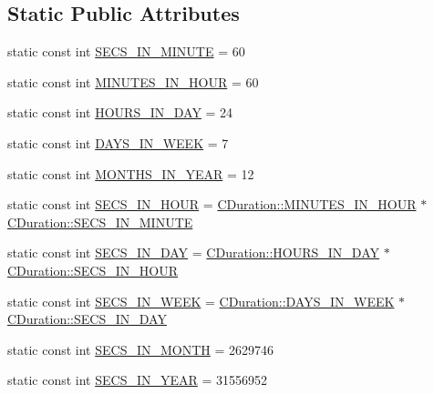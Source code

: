 \subsection*{Static Public Attributes}
\begin{DoxyCompactItemize}
\item 
static const int \mbox{\hyperlink{class_c_duration_add8e91add3f049bee7409b5a3eca2c4c}{S\+E\+C\+S\+\_\+\+I\+N\+\_\+\+M\+I\+N\+U\+TE}} = 60
\item 
static const int \mbox{\hyperlink{class_c_duration_a97547b80518b4782cdc7ae2be794c14d}{M\+I\+N\+U\+T\+E\+S\+\_\+\+I\+N\+\_\+\+H\+O\+UR}} = 60
\item 
static const int \mbox{\hyperlink{class_c_duration_a1386b34674231b66d05ad983b21fbda0}{H\+O\+U\+R\+S\+\_\+\+I\+N\+\_\+\+D\+AY}} = 24
\item 
static const int \mbox{\hyperlink{class_c_duration_a70bfd43f9e8221efda74c324954edc6a}{D\+A\+Y\+S\+\_\+\+I\+N\+\_\+\+W\+E\+EK}} = 7
\item 
static const int \mbox{\hyperlink{class_c_duration_a49e70012782936663d6c5bdf231f2e94}{M\+O\+N\+T\+H\+S\+\_\+\+I\+N\+\_\+\+Y\+E\+AR}} = 12
\item 
static const int \mbox{\hyperlink{class_c_duration_ae05145b20b2601dfa515de4dab5dbb16}{S\+E\+C\+S\+\_\+\+I\+N\+\_\+\+H\+O\+UR}} = \mbox{\hyperlink{class_c_duration_a97547b80518b4782cdc7ae2be794c14d}{C\+Duration\+::\+M\+I\+N\+U\+T\+E\+S\+\_\+\+I\+N\+\_\+\+H\+O\+UR}} $\ast$ \mbox{\hyperlink{class_c_duration_add8e91add3f049bee7409b5a3eca2c4c}{C\+Duration\+::\+S\+E\+C\+S\+\_\+\+I\+N\+\_\+\+M\+I\+N\+U\+TE}}
\item 
static const int \mbox{\hyperlink{class_c_duration_ab2a36fede0ab98656bbfc411f32bc0e9}{S\+E\+C\+S\+\_\+\+I\+N\+\_\+\+D\+AY}} = \mbox{\hyperlink{class_c_duration_a1386b34674231b66d05ad983b21fbda0}{C\+Duration\+::\+H\+O\+U\+R\+S\+\_\+\+I\+N\+\_\+\+D\+AY}} $\ast$ \mbox{\hyperlink{class_c_duration_ae05145b20b2601dfa515de4dab5dbb16}{C\+Duration\+::\+S\+E\+C\+S\+\_\+\+I\+N\+\_\+\+H\+O\+UR}}
\item 
static const int \mbox{\hyperlink{class_c_duration_a229cd2ab64c5f8614399fa0680aa48a1}{S\+E\+C\+S\+\_\+\+I\+N\+\_\+\+W\+E\+EK}} = \mbox{\hyperlink{class_c_duration_a70bfd43f9e8221efda74c324954edc6a}{C\+Duration\+::\+D\+A\+Y\+S\+\_\+\+I\+N\+\_\+\+W\+E\+EK}} $\ast$ \mbox{\hyperlink{class_c_duration_ab2a36fede0ab98656bbfc411f32bc0e9}{C\+Duration\+::\+S\+E\+C\+S\+\_\+\+I\+N\+\_\+\+D\+AY}}
\item 
static const int \mbox{\hyperlink{class_c_duration_a4ba348c564db1bdb4bd302905827d584}{S\+E\+C\+S\+\_\+\+I\+N\+\_\+\+M\+O\+N\+TH}} = 2629746
\item 
static const int \mbox{\hyperlink{class_c_duration_a73a041338527394a6758d4f80919eacc}{S\+E\+C\+S\+\_\+\+I\+N\+\_\+\+Y\+E\+AR}} = 31556952
\end{DoxyCompactItemize}
